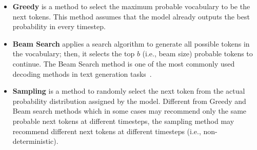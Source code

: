 \begin{itemize}
    \item \textbf{Greedy} is a method to select the maximum probable vocabulary to be the next tokens.
    This method assumes that the model already outputs the best probability in every timestep.
    
    \item \textbf{Beam Search} applies a search algorithm to generate all possible tokens in the vocabulary; then, it selects the top $b$ (i.e., beam size) probable tokens to continue.
    The Beam Search method is one of the most commonly used decoding methods in text generation tasks~\cite{li-etal-2016-deep, wiseman-etal-2017-challenges}.
    
    

    
    
    
      
    
    \item \textbf{Sampling} is a method to randomly select the next token from the actual probability distribution assigned by the model.
    Different from Greedy and Beam search methods which in some cases may recommend only the same probable next tokens at different timesteps, the sampling method may recommend different next tokens at different timesteps (i.e., non-deterministic).
    

\end{itemize}
